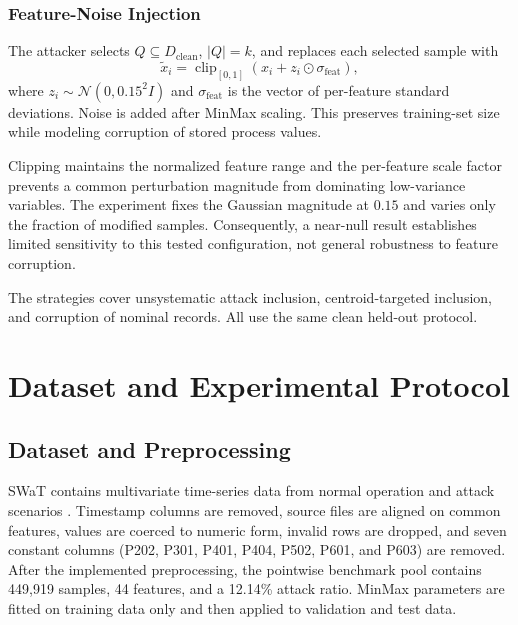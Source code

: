 \documentclass[10pt,conference]{IEEEtran}
\begin{document}
\subsubsection{Feature-Noise Injection}
The attacker selects $Q\subseteq D_{\mathrm{clean}}$, $|Q|=k$, and replaces each selected sample with
\begin{equation}
\tilde{x}_i=\operatorname{clip}_{[0,1]}(x_i+z_i\odot\sigma_{\mathrm{feat}}),
\end{equation}
where $z_i\sim\mathcal{N}(0,0.15^2I)$ and $\sigma_{\mathrm{feat}}$ is the vector of per-feature standard deviations. Noise is added after MinMax scaling. This preserves training-set size while modeling corruption of stored process values.

Clipping maintains the normalized feature range and the per-feature scale factor prevents a common perturbation magnitude from dominating low-variance variables. The experiment fixes the Gaussian magnitude at $0.15$ and varies only the fraction of modified samples. Consequently, a near-null result establishes limited sensitivity to this tested configuration, not general robustness to feature corruption.

The strategies cover unsystematic attack inclusion, centroid-targeted inclusion, and corruption of nominal records. All use the same clean held-out protocol.

\section{Dataset and Experimental Protocol}

\subsection{Dataset and Preprocessing}

SWaT contains multivariate time-series data from normal operation and attack scenarios \cite{mathur2016swat,goh2017dataset}. Timestamp columns are removed, source files are aligned on common features, values are coerced to numeric form, invalid rows are dropped, and seven constant columns (P202, P301, P401, P404, P502, P601, and P603) are removed. After the implemented preprocessing, the pointwise benchmark pool contains 449,919 samples, 44 features, and a 12.14\% attack ratio. MinMax parameters are fitted on training data only and then applied to validation and test data.
\end{document}
